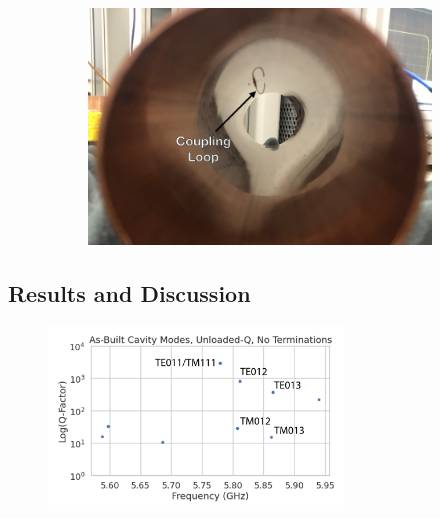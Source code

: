 \begin{figure}[htbp]
\begin{subfigure}{0.48\textwidth}
        \caption{}
    \end{subfigure}
    \hfill
    \begin{subfigure}{0.48\textwidth}
        \includegraphics*[width=\textwidth]{figs/Chapter-6/230612_coupling_loop.png}
        \caption{}
    \end{subfigure}
    \caption{}
\end{figure}

\subsection{Results and Discussion}

\begin{figure}[htbp]
    \centering
    \includegraphics*[width=0.7\textwidth]{figs/Chapter-6/230612_simulated_toy_cav_no_term_modes_annotated.png}
    \caption{}
\end{figure}

